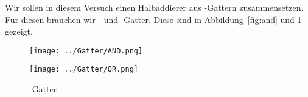 Wir sollen in diesem Versuch einen Halbaddierer aus \tnand-Gattern
zusammensetzen. Für diesen brauchen wir \tand- und \tor-Gatter. Diese sind in
Abbildung~\ref{fig:and} und \ref{fig:or} gezeigt.

\begin{figure}[htbp]
	\centering
	\begin{minipage}{.45\linewidth}
		\texttt{[image: ../Gatter/AND.png]}
		\caption{%
			\tand-Gatter.
			\cite[Seite~20]{wirsum/experimente_schaltglieder}
		}
		\label{fig:and}
	\end{minipage}
	\hfill
	\begin{minipage}{.45\linewidth}
		\texttt{[image: ../Gatter/OR.png]}
		\caption{%
			\tor-Gatter
			\cite[Seite~21]{wirsum/experimente_schaltglieder}
		}
		\label{fig:or}
	\end{minipage}
\end{figure}


\FloatBarrier
\IfFileExists{\bibliographyfile}{
	
}{}



